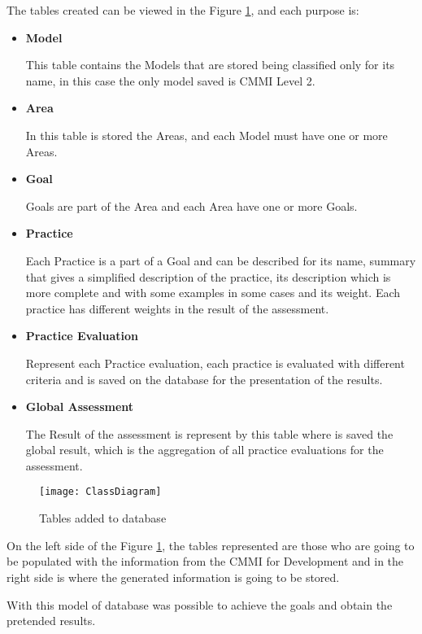 The tables created can be viewed in the Figure \ref{fig:database}, and each purpose is:
\begin{itemize}
	\item \textbf{Model}
	
	This table contains the Models that are stored being classified only for its name, in this case the only model saved is CMMI Level 2.
	\item \textbf{Area}
	
	In this table is stored the Areas, and each Model must have one or more Areas.
	\item \textbf{Goal}
	
	Goals are part of the Area and each Area have one or more Goals.
	\item \textbf{Practice}
	
	Each Practice is a part of a Goal and can be described for its name, summary that gives a simplified description of the practice, its description which is more complete and with some examples in some cases and its weight. Each practice has different weights in the result of the assessment.
	
	\item \textbf{Practice Evaluation}
	
	Represent each Practice evaluation, each practice is evaluated with different criteria and is saved on the database for the presentation of the results.
	
	\item \textbf{Global Assessment}
	
	The Result of the assessment is represent by this table where is saved the global result, which is the aggregation of all practice evaluations for the assessment.
	
\end{itemize}

\begin{figure}[h]
	\begin{center}
		\leavevmode
		\texttt{[image: ClassDiagram]}
		\caption{Tables added to database}
		\label{fig:database}
	\end{center}
\end{figure}


On the left side of the Figure \ref{fig:database}, the tables represented are those who are going to be populated with the information from the CMMI for Development and in the right side is where the generated information is going to be stored.

With this model of database was possible to achieve the goals and obtain the pretended results.

